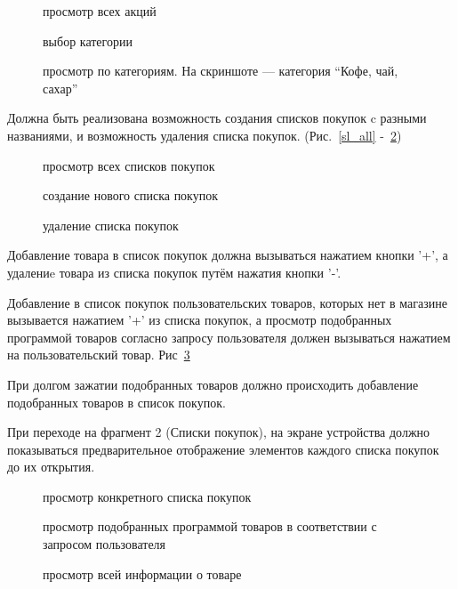 \begin{figure}[h!]
    \centering
    \caption{\small{просмотр всех акций}}
    \label{items}
    \endminipage\hfill
    \caption{\small{выбор категории}}
    \label{categs_1}
    \endminipage\hfill
    \caption{\small{просмотр по категориям. На скриншоте --- категория ``Кофе, чай, сахар''}}
    \label{categs_2}
    \endminipage{}
\end{figure}

Должна быть реализована возможность создания списков покупок c разными названиями,
и возможность удаления списка покупок. (Рис.~\ref{sl_all} -~\ref{delete_sl})

\begin{figure}[h!]
    \centering
    \caption{\small{просмотр всех списков покупок}}
    \label{sl_all}
    \endminipage\hfill
    \caption{\small{создание нового списка покупок}}
    \endminipage\hfill
    \caption{\small{удаление списка покупок}}
    \label{delete_sl}
    \endminipage{}
\end{figure}

Добавление товара в список покупок должна вызываться нажатием кнопки '+', а
удалениe товара из списка покупок путём нажатия кнопки '-'.

Добавление в список
покупок пользовательских товаров, которых нет в магазине вызывается нажатием
'+' из списка покупок, а просмотр подобранных программой товаров согласно
запросу пользователя должен вызываться нажатием на пользовательский товар.
Рис~\ref{custom}

При долгом зажатии подобранных товаров должно происходить добавление
подобранных товаров в список покупок.

При переходе на фрагмент 2 (Списки покупок), на экране устройства должно
показываться предварительное отображение элементов каждого списка покупок до их
открытия.

\begin{figure}[h!]
    \centering
    \caption{\small{просмотр конкретного списка покупок}}
    \endminipage\hfill
    \caption{\small{просмотр подобранных программой товаров в соответствии с запросом пользователя}}
    \label{custom}
    \endminipage\hfill
    \caption{\small{просмотр всей информации о товаре}}
    \endminipage{}
\end{figure}

